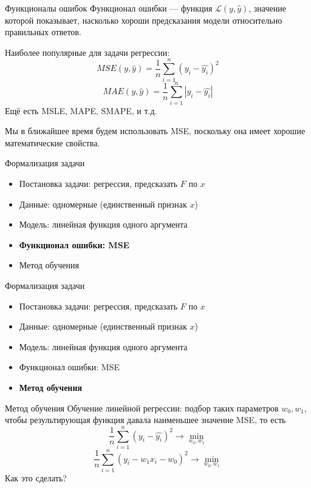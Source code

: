 \documentclass[aspectratio=169]{beamer}
\begin{document}
\begin{frame}{Функционалы ошибок}
    Функционал ошибки --- функция \( \mathcal{L}(y, \hat{y}) \), значение
    которой показывает, насколько хороши предсказания модели относительно
    правильных ответов.
    \pause{}

    Наиболее популярные для задачи регрессии:
    {\large
        \[ MSE(y, \hat{y}) = \frac{1}{n} \sum_{i=1}^n {(y_i - \hat{y_i})}^2 \]
        \[ MAE (y, \hat{y}) = \frac{1}{n} \sum_{i=1}^n {|y_i - \hat{y_i}|} \]
    }
    Ещё есть MSLE, MAPE, SMAPE, и т.д.

    Мы в ближайшее время будем использовать MSE, поскольку она имеет хорошие
    математические свойства.
\end{frame}

\begin{frame}{Формализация задачи}
    \begin{itemize}
        \item Постановка задачи: регрессия, предсказать \( F \) по \( x \)
        \item Данные: одномерные (единственный признак \( x \))
        \item Модель: линейная функция одного аргумента
        \item \textbf{Функционал ошибки: MSE}
        \item Метод обучения
    \end{itemize}
\end{frame}

\begin{frame}{Формализация задачи}
    \begin{itemize}
        \item Постановка задачи: регрессия, предсказать \( F \) по \( x \)
        \item Данные: одномерные (единственный признак \( x \))
        \item Модель: линейная функция одного аргумента
        \item Функционал ошибки: MSE
        \item \textbf{Метод обучения}
    \end{itemize}
\end{frame}

\begin{frame}{Метод обучения}
    Обучение линейной регрессии: подбор таких параметров \( w_0, w_1 \), чтобы результирующая
    функция давала наименьшее значение MSE, то есть
    {\Large
        \[ \frac{1}{n} \sum_{i=1}^n {(y_i - \hat{y_i})}^2 \rightarrow \min_{w_0, w_1} \]
        \pause{}
        \[ \frac{1}{n} \sum_{i=1}^n {(y_i - w_1 x_i - w_0 )}^2 \rightarrow \min_{w_0, w_1} \]
    }
    Как это сделать?
\end{frame}
\end{document}
